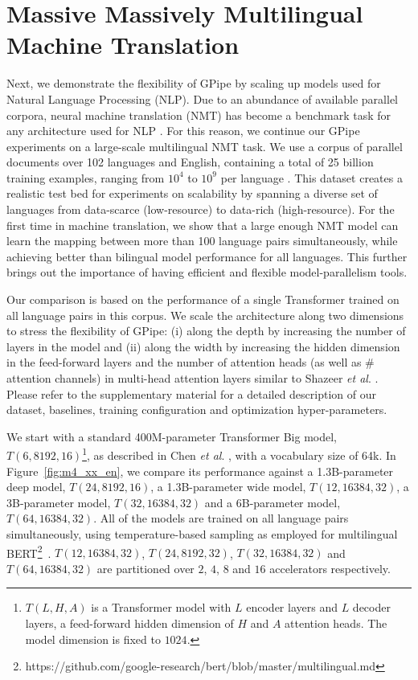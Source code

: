 \documentclass{article}
\def\codename{GPipe}
\def\onedot{.}
\def\etal{\emph{et al}\onedot}
\begin{document}
\section{Massive Massively Multilingual Machine Translation}
\label{sec:mt}
Next, we demonstrate the flexibility of \codename{} by scaling up models used for Natural Language Processing (NLP). Due to an abundance of available parallel corpora, neural machine translation (NMT) has become a benchmark task for any architecture used for NLP \cite{DBLP:journals/corr/GehringAGYD17,vaswani2017attention,shazeer2018mesh,theBestofBothWorlds18,DBLP:journals/corr/abs-1901-10430}. For this reason, we continue our \codename{} experiments on a large-scale multilingual NMT task. We use a corpus of parallel documents over 102 languages and English, containing a total of 25 billion training examples, ranging from $10^4$ to $10^9$ per language \cite{arivazhagan2019massively}. This dataset creates a realistic test bed for experiments on scalability by spanning a diverse set of languages from data-scarce (low-resource) to data-rich (high-resource). For the first time in machine translation, we show that a large enough NMT model can learn the mapping between more than 100 language pairs simultaneously, while achieving better than bilingual model performance for all languages. This further brings out the importance of having efficient and flexible model-parallelism tools.

Our comparison is based on the performance of a single Transformer \cite{vaswani2017attention} trained on all language pairs in this corpus. We scale the architecture along two dimensions to stress the flexibility of \codename{}: (i) along the depth by increasing the number of layers in the model and (ii) along the width by increasing the hidden dimension in the feed-forward layers and the number of attention heads (as well as \# attention channels) in multi-head attention layers similar to Shazeer \etal{} \cite{shazeer2018mesh}. Please refer to the supplementary material for a detailed description of our dataset, baselines, training configuration and optimization hyper-parameters.

We start with a standard 400M-parameter Transformer Big model, $T(6, 8192, 16)$\footnote{$T(L, H, A)$ is a Transformer model with $L$ encoder layers and $L$ decoder layers, a feed-forward hidden dimension of $H$ and $A$ attention heads. The model dimension is fixed to $1024$.}, as described in Chen \etal{} \cite{theBestofBothWorlds18}, with a vocabulary size of 64k. In Figure~\ref{fig:m4_xx_en}, we compare its performance against a 1.3B-parameter deep model, $T(24, 8192, 16)$, a 1.3B-parameter wide model, $T(12, 16384, 32)$, a 3B-parameter model, $T(32, 16384, 32)$ and a 6B-parameter model, $T(64, 16384, 32)$. All of the models are trained on all language pairs simultaneously, using temperature-based sampling as employed for multilingual BERT\footnote{https://github.com/google-research/bert/blob/master/multilingual.md}~\cite{Devlin2018bert}. $T(12, 16384, 32)$, $T(24, 8192, 32)$, $T(32, 16384, 32)$ and $T(64, 16384, 32)$ are partitioned over $2$, $4$, $8$ and $16$ accelerators respectively.
\end{document}
